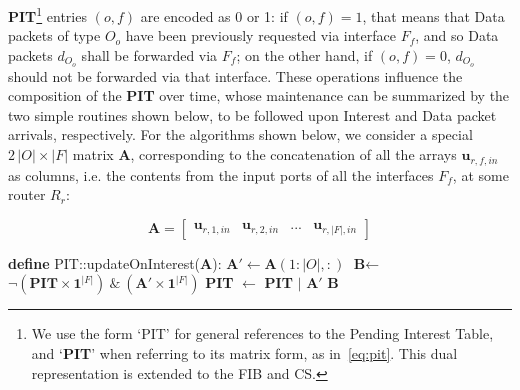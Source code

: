 \textbf{PIT}\footnote{We use the form `PIT' for general references to the Pending 
Interest Table, and `\textbf{PIT}' when referring to its matrix form, as in~\ref{eq:pit}. 
This dual representation is extended to the FIB and CS.} entries 
$(o,f)$ are encoded as 0 or 1: if $(o,f) = 1$, that means that Data 
packets of 
type $O_o$ have been previously requested via interface $F_f$, and so Data 
packets $d_{O_o}$ shall be forwarded via $F_f$; on the other hand, 
if $(o,f) = 0$, $d_{O_o}$ should not be forwarded via that 
interface. These operations influence the composition of the \textbf{PIT} over time, whose 
maintenance can be summarized by the two simple routines shown below, to be 
followed upon Interest and Data packet arrivals, respectively. For the algorithms shown 
below, we consider a special $2\,|O| \times |F|$ matrix \textbf{A}, corresponding to the concatenation of 
all the arrays $\textbf{u}_{r,f,in}$ as columns, i.e. the contents from the input ports 
of all the interfaces $F_f$, at some router $R_r$:

\begin{equation}
\textbf{A} = \begin{bmatrix} \textbf{u}_{r,1,in} & \textbf{u}_{r,2,in} & ... & \textbf{u}_{r,|F|,in} \end{bmatrix}
    \label{eq:a}
\end{equation}\shortvertbreak

\begin{algorithmic}[1]

\State \textbf{define} PIT::updateOnInterest(\textbf{A}):
\State
    \State $\textbf{A}' \leftarrow \textbf{A}(1:|O|,:)$
    \State $\textbf{B} \leftarrow$ $\neg(\textbf{PIT} \times \textbf{1}^{|F|}) \ \& \ (\textbf{A}' \times \textbf{1}^{|F|})$
    \State \textbf{PIT} $\leftarrow$ \textbf{PIT} $|$ $\textbf{A}'$ 
    \State \Return $\textbf{B}$

\end{algorithmic}\shortvertbreak

